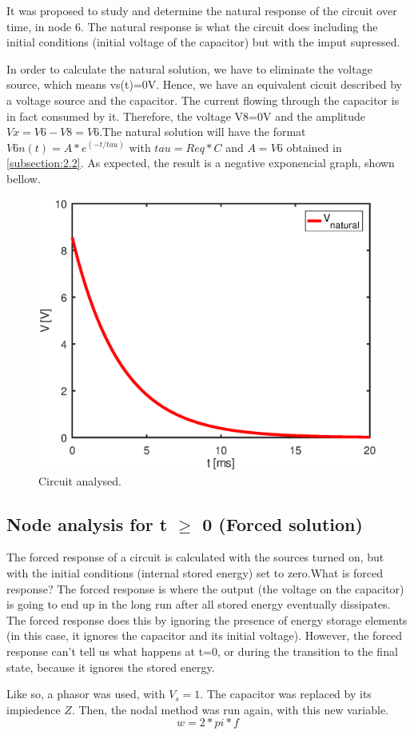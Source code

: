 It was proposed to study and determine the natural response of the circuit over time, in node 6. The natural response is what the circuit does including the initial conditions (initial voltage of the capacitor) but with the imput supressed. 

In order to calculate the natural solution, we have to eliminate the voltage source, which means vs(t)=0V. Hence, we have an equivalent cicuit described by a voltage source and the capacitor. The current flowing through the capacitor is in fact consumed by it. Therefore, the voltage V8=0V and the amplitude $Vx=V6-V8=V6$.The natural solution will have the format $V{6n}(t)=A*e^{(-t/tau)}$ with $tau=Req*C$ and $A=V6$ obtained in \ref{subsection:2.2}. As expected, the result is a negative exponencial graph, shown bellow.

\begin{figure}[ht] \centering
\includegraphics[width=0.5\linewidth]{natural.eps}
\caption{Circuit analysed.}
\label{fig:sim3}
\end{figure}



\subsection{Node analysis for t $\ge$ 0 (Forced solution)}

The forced response of a circuit is calculated with the sources turned on, but with the initial conditions (internal stored energy) set to zero.What is forced response? The forced response is where the output (the voltage on the capacitor) is going to end up in the long run after all stored energy eventually dissipates. The forced response does this by ignoring the presence of energy storage elements (in this case, it ignores the capacitor and its initial voltage). However, the forced response can't tell us what happens at t=0, or during the transition to the final state, because it ignores the stored energy. 
\par Like so, a phasor was used, with $V_{s}=1$. The capacitor was replaced by its impiedence $Z$. Then, the nodal method was run again, with this new variable.
\begin{equation}
w=2*pi*f
\end{equation} 

